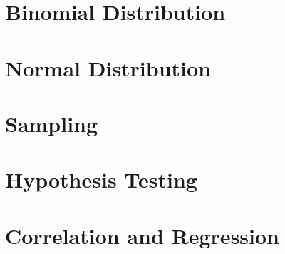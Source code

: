 \documentclass{report}
\begin{document}
\begin{multicols}{2}
    \chapter{Binomial Distribution}
    \chapter{Normal Distribution}
    \chapter{Sampling}
    \chapter{Hypothesis Testing}
    \chapter{Correlation and Regression}

\end{multicols}
\end{document}
